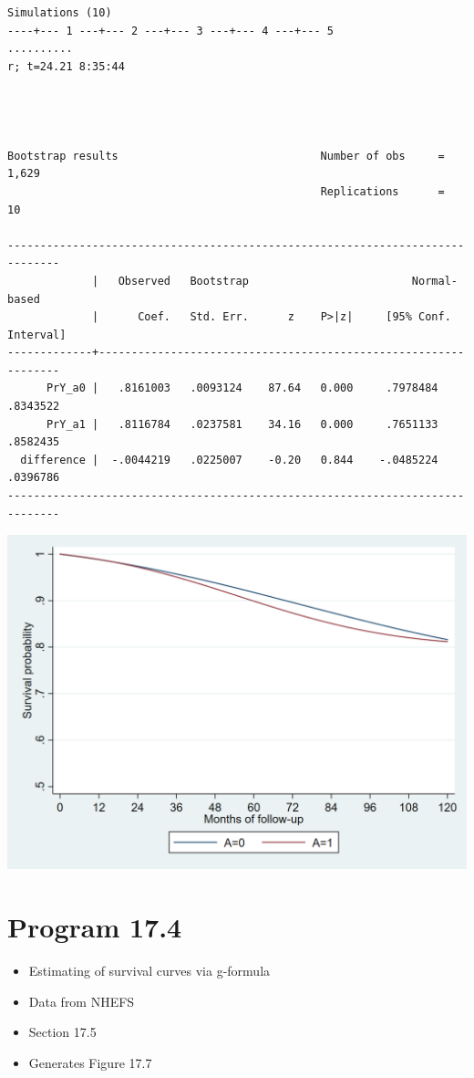 \documentclass[
  10pt,
]{book}
\providecommand{\tightlist}{%
  \setlength{\itemsep}{0pt}\setlength{\parskip}{0pt}}
\begin{document}
\begin{verbatim}
Simulations (10)
----+--- 1 ---+--- 2 ---+--- 3 ---+--- 4 ---+--- 5 
..........
r; t=24.21 8:35:44




Bootstrap results                               Number of obs     =      1,629
                                                Replications      =         10

------------------------------------------------------------------------------
             |   Observed   Bootstrap                         Normal-based
             |      Coef.   Std. Err.      z    P>|z|     [95% Conf. Interval]
-------------+----------------------------------------------------------------
      PrY_a0 |   .8161003   .0093124    87.64   0.000     .7978484    .8343522
      PrY_a1 |   .8116784   .0237581    34.16   0.000     .7651133    .8582435
  difference |  -.0044219   .0225007    -0.20   0.844    -.0485224    .0396786
------------------------------------------------------------------------------
\end{verbatim}

\begin{center}\includegraphics[width=0.85\linewidth]{./figs/stata-fig-17-3} \end{center}

\hypertarget{program-17.4-1}{%
\section{Program 17.4}\label{program-17.4-1}}

\begin{itemize}
\tightlist
\item
  Estimating of survival curves via g-formula
\item
  Data from NHEFS
\item
  Section 17.5
\item
  Generates Figure 17.7
\end{itemize}
\end{document}
